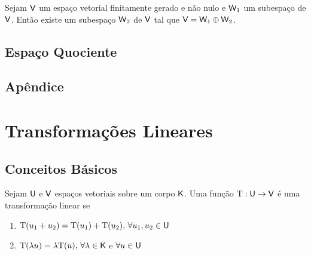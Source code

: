 \documentclass[10pt,a4paper]{book}
\begin{document}
\begin{proposition}
	Sejam $\mathsf{ V }$ um espaço vetorial finitamente gerado e não nulo e $\mathsf{ W }_1$ um subespaço de $\mathsf{ V }$. Então existe um subespaço $\mathsf{ W }_2$ de $\mathsf{ V }$ tal que $\mathsf{ V } = \mathsf{ W }_1 \oplus \mathsf{ W }_2$.
\end{proposition}




\section{Espaço Quociente}




\section{Apêndice}




\chapter{Transformações Lineares}




\section{Conceitos Básicos}
\begin{definition}
	Sejam $\mathsf{ U }$ e $\mathsf{ V }$ espaços vetoriais sobre um corpo $\mathsf{ K }$. Uma função $\mathrm{ T } : \mathsf{ U } \rightarrow \mathsf{ V }$ é uma transformação linear se
	\begin{enumerate}
		\item $\mathrm{ T }(u_1 + u_2) = \mathrm{ T }(u_1) + \mathrm{ T }(u_2), \, \forall u_1, u_2 \in \mathsf{ U }$
		\item $\mathrm{ T }(\lambda u) = \lambda \mathrm{ T }(u), \, \forall \lambda \in \mathsf{ K }$ e $\forall u \in \mathsf{ U }$
	\end{enumerate}
\end{definition}
\end{document}
